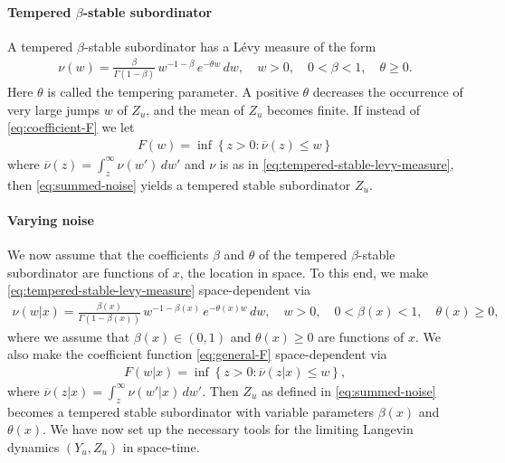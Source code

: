 \documentclass[a4paper,12pt]{elsarticle}
\numberwithin{equation}{section}
\theoremstyle{plain}
\theoremstyle{definition}
\theoremstyle{remark}
\numberwithin{equation}{section}
\newcommand{\1}{\mathbf 1}
\begin{document}
\paragraph{Tempered $\beta$-stable subordinator}
A tempered $\beta$-stable subordinator has a L\'evy measure of the form
\begin{align}
  \label{eq:tempered-stable-levy-measure}
  \nu(w) = \frac{\beta}{\Gamma(1-\beta)}\, w^{-1-\beta}\,e^{-\theta w}\,dw, 
  \quad w > 0, \quad 0 < \beta < 1, \quad \theta \ge 0. 
\end{align}
Here $\theta$ is called the tempering parameter. A positive $\theta$ decreases 
the occurrence of very large jumps $w$ of $Z_u$, and the mean of $Z_u$ becomes 
finite.  If instead of \eqref{eq:coefficient-F} we let 
\begin{align} \label{eq:general-F}
  F(w) = \inf\left\lbrace z > 0: \overline \nu(z) \le w \right\rbrace
\end{align}
where $\overline \nu(z) = \int_z^\infty \nu(w')\,dw'$ and $\nu$ is as in \eqref{eq:tempered-stable-levy-measure}, then 
\eqref{eq:summed-noise}
yields a tempered stable subordinator $Z_u$.

\paragraph{Varying noise}
We now assume that the coefficients $\beta$ and $\theta$ of the tempered 
$\beta$-stable subordinator are functions of $x$, the location in space. 
To this end, we make 
\eqref{eq:tempered-stable-levy-measure} space-dependent via
\begin{align}
  \label{eq:varying-tempered-stable-levy-measure}
  \nu(w | x) = \frac{\beta(x)}{\Gamma(1-\beta(x))}\, 
  w^{-1-\beta(x)}\,e^{-\theta(x) w}\,dw, 
  \quad w > 0, \quad 0 < \beta(x) < 1, \quad \theta(x) \ge 0, 
\end{align}
where we assume that $\beta(x) \in (0,1)$ and $\theta(x) \ge 0$ are  
functions of $x$.
We also make the coefficient function \eqref{eq:general-F} space-dependent via
\begin{align} \label{eq:varying-general-F}
  F(w|x) = \inf\left\lbrace z > 0: \overline \nu(z | x) \le w 
  \right\rbrace,
\end{align}
where $\overline \nu(z | x) = \int_z^\infty \nu(w'|x)\,dw'$.
Then $Z_u$ as defined in \eqref{eq:summed-noise} becomes a tempered stable 
subordinator with variable parameters $\beta(x)$ and $\theta(x)$. 
We have now set up the necessary tools for the limiting Langevin 
dynamics $(Y_u, Z_u)$ in space-time.
\end{document}
